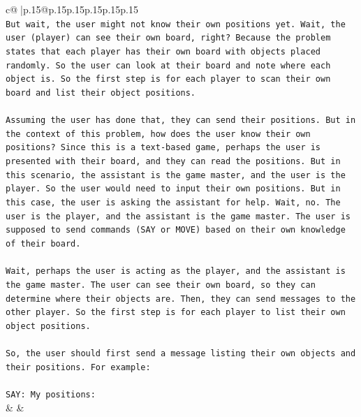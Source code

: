 \documentclass{article}
\begin{document}
{\begin{supertabular}{c@{$\;$}|p{.15\linewidth}@{}p{.15\linewidth}p{.15\linewidth}p{.15\linewidth}p{.15\linewidth}p{.15\linewidth}}
{{{\\ 
\texttt{But wait, the user might not know their own positions yet. Wait, the user (player) can see their own board, right? Because the problem states that each player has their own board with objects placed randomly. So the user can look at their board and note where each object is. So the first step is for each player to scan their own board and list their object positions.} \\
\\ 
\texttt{Assuming the user has done that, they can send their positions. But in the context of this problem, how does the user know their own positions? Since this is a text{-}based game, perhaps the user is presented with their board, and they can read the positions. But in this scenario, the assistant is the game master, and the user is the player. So the user would need to input their own positions. But in this case, the user is asking the assistant for help. Wait, no. The user is the player, and the assistant is the game master. The user is supposed to send commands (SAY or MOVE) based on their own knowledge of their board.} \\
\\ 
\texttt{Wait, perhaps the user is acting as the player, and the assistant is the game master. The user can see their own board, so they can determine where their objects are. Then, they can send messages to the other player. So the first step is for each player to list their own object positions.} \\
\\ 
\texttt{So, the user should first send a message listing their own objects and their positions. For example:} \\
\\ 
\texttt{SAY: My positions:} \\
            }
        }
    }
    & & \\ \\


\end{supertabular}}
\end{document}
